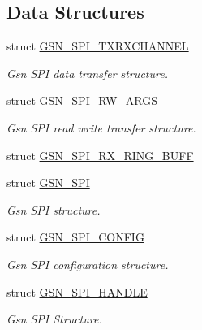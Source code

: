 \subsection*{Data Structures}
\begin{DoxyCompactItemize}
\item 
struct \hyperlink{a00241}{GSN\_\-SPI\_\-TXRXCHANNEL}
\begin{DoxyCompactList}\small\item\em Gsn SPI data transfer structure. \end{DoxyCompactList}\item 
struct \hyperlink{a00239}{GSN\_\-SPI\_\-RW\_\-ARGS}
\begin{DoxyCompactList}\small\item\em Gsn SPI read write transfer structure. \end{DoxyCompactList}\item 
struct \hyperlink{a00240}{GSN\_\-SPI\_\-RX\_\-RING\_\-BUFF}
\item 
struct \hyperlink{a00230}{GSN\_\-SPI}
\begin{DoxyCompactList}\small\item\em Gsn SPI structure. \end{DoxyCompactList}\item 
struct \hyperlink{a00231}{GSN\_\-SPI\_\-CONFIG}
\begin{DoxyCompactList}\small\item\em Gsn SPI configuration structure. \end{DoxyCompactList}\item 
struct \hyperlink{a00238}{GSN\_\-SPI\_\-HANDLE}
\begin{DoxyCompactList}\small\item\em Gsn SPI Structure. \end{DoxyCompactList}\end{DoxyCompactItemize}
